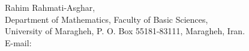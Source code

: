 \documentclass[14pt]{amsart}
\theoremstyle{plain}
\theoremstyle{definition}
\theoremstyle{remark}
\theoremstyle{example}
\begin{document}
\ \\ \\
Rahim Rahmati-Asghar,\\
Department of Mathematics, Faculty of Basic Sciences,\\
University of Maragheh, P. O. Box 55181-83111, Maragheh, Iran.\\
E-mail:  
\end{document}
